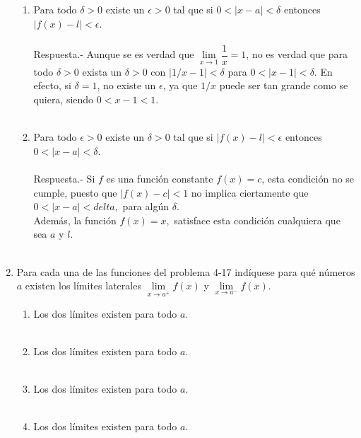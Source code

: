 \begin{enumerate}
\begin{enumerate}[\bfseries (a)]
    \item Para todo $\delta >0$ existe un $\epsilon>0$ tal que si $0<|x-a|<\delta$ entonces $|f(x)-l|<\epsilon$.\\\\
	Respuesta.-\; Aunque se es verdad que $\lim\limits_{x\to 1}\dfrac{1}{x}=1$, no es verdad que para todo $\delta>0$ exista un $\delta>0$ con $|1/x-1|<\delta$ para $0<|x-1|<\delta$. En efecto, si $\delta=1$, no existe un $\epsilon$, ya que $1/x$ puede ser tan grande como se quiera, siendo $0<x-1<1$.\\\\

    \item Para todo $\epsilon>0$ existe un $\delta > 0$ tal que si $|f(x)-l|<\epsilon$ entonces $0<|x-a|<\delta$.\\\\
	Respuesta.-\; Si $f$ es una función constante $f(x)=c$, esta condición no se cumple, puesto que $|f(x)-c|<1$ no implica ciertamente que $0<|x-a|<delta,$ para algún $\delta$.\\
	Además, la función $f(x)=x,$ satisface esta condición cualquiera que sea $a$ y $l$.\\\\

\end{enumerate}

\item Para cada una de las funciones del problema 4-17 indíquese para qué números $a$ existen los límites laterales $\lim\limits_{x\to a^+} f(x)$ y $\lim\limits_{x\to a^-} f(x)$.
\begin{enumerate}[\bfseries (i)]

    \item Los dos límites existen para todo $a$.\\\\

    \item Los dos límites existen para todo $a$.\\\\

    \item Los dos límites existen para todo $a$.\\\\

    \item Los dos límites existen para todo $a$.\\\\


\end{enumerate}
\end{enumerate}
